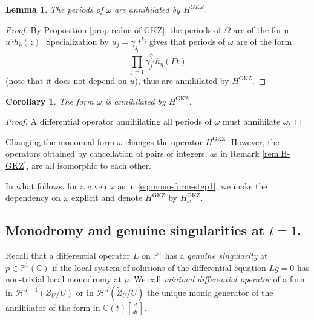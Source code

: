 \documentclass[11pt, reqno]{amsart}
\theoremstyle{plain}
\newtheorem{corol}[thm]{Corollary}
\newtheorem{lem}[thm]{Lemma}
\theoremstyle{definition}
\newcommand{\PP}{\mathbb{P}}
\newcommand{\CC}{\mathbb{C}}
\newcommand{\Ps}{\mathbb{P}}
\begin{document}
\begin{lem}
The periods of $\omega$ are annihilated by $H^{GKZ}$.
\end{lem}



\begin{proof}
By Proposition \ref{prop:reduc-of-GKZ}, the periods of $\Omega$ are of the form $u^{\bar{\eta}} h_{\bar{\eta}}(z)$.
Specialization by $u_j=\gamma_j  t^{k_j}$ gives that periods of $\omega$
are of the form
\[
\prod_{j=1}^l \gamma_j^{\bar{\eta}_j } h_{\bar{\eta}}(\Gamma t) 
\] 
(note that it does not depend on  $u$), thus are annihilated by $H^{\mathrm{GKZ}}$. 
\end{proof}

\begin{corol}\label{cor:omega-HGKZ}
The form $\omega$ is annihilated by $H^{\mathrm{GKZ}}$.
\end{corol}


\begin{proof}
A differential operator annihilating all periods of $\omega$ must annihilate $\omega$.
\end{proof}


Changing the monomial form $\omega$ changes the operator $H^{\mathrm{GKZ}}$. However, the operators obtained by cancellation of pairs of integers, as in Remark \ref{rem:H-GKZ}, are all isomorphic to each other. 

In what follows, for a given $\omega$ as in \eqref{eq:mono-form-step1}, we make the dependency on $\omega$ explicit and denote $H^{\mathrm{GKZ}}$ by $H^{\mathrm{GKZ}}_\omega$. 


\subsection{Monodromy and genuine singularities at $t=1$.}
\label{sec:2}

Recall that a differential operator $L$ on $\Ps^1$ has a \emph{genuine singularity} at  $p \in \PP^1(\CC)$ if the local system of solutions of the differential equation $L g=0$ has non-trivial local monodromy at $p$.
We call \emph{minimal differential operator} of a form in $\mathcal{H}^{d-1}(Z_U/U)$ or in $\mathcal{H}^{d}(\widetilde{Z}_U/U)$ the unique monic generator of the annihilator of the form in $\CC(t)[\frac{d}{dt}]$. 
\end{document}
